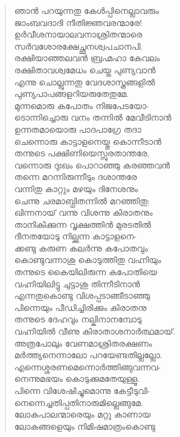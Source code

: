 \begin{verse}
ഞാന്‍ പറയുന്നതു കേള്‍പ്പിനെല്ലാവരും\\
ജാംബവദാദി നീതിജ്ഞവരന്മാരേ!\\
ഉര്‍വീശനായാലവനാശ്രിതന്മാരെ\\
സര്‍വശോരക്ഷേച്ഛുനശ്വപചാനപി.\\
രക്ഷിയാഞ്ഞലവന്‍ ബ്രഹ്മഹാ കേവലം\\
രക്ഷിതാവശ്വമേധം ചെയ്ത പുണ്യവാന്‍\\
എന്നു ചൊല്ലുന്നതു വേദശാസ്ത്രങ്ങളില്‍\\
പുണ്യപാപങ്ങളറിയരുതേതുമേ.\\
മുന്നമൊരു കപോതം നിജപേടയോ-\\
ടൊന്നിച്ചൊരു വനം തന്നില്‍ മേവീടിനാന്‍\\
ഉന്നതമായൊരു പാദപാഗ്രേ തദാ\\
ചെന്നൊരു കാട്ടാളനെയ്തു കൊന്നീടാന്‍\\
തന്നുടെ പക്ഷിണിയെസ്സുരതാന്തരേ,\\
വന്നൊരു ദുഃഖം പൊറാഞ്ഞു കരഞ്ഞവന്‍\\
തന്നെ മറന്നിരുന്നീടും ദശാന്തരേ\\
വന്നിതു കാറ്റും മഴയും ദിനേശനും\\
ചെന്നു ചരമാബ്ധിതന്നില്‍ മറഞ്ഞിതു;\\
ഖിന്നനായ് വന്നു വിശന്നു കിരാതനും\\
താനികിക്കുന്ന വൃക്ഷത്തിന്‍ മുരടതില്‍\\
ദീനതയോടു നില്ക്കുന്ന കാട്ടാളനെ-\\
ക്കണ്ടു കരുണ കലര്‍ന്നു കപോതവും\\
കൊണ്ടുവന്നാശു കൊടുത്തിതു വഹ്നിയും\\
തന്നുടെ കൈയിലിരുന്ന കപോതിയെ\\
വഹ്നിയിലിട്ടു ചുട്ടാശു തിന്നീടിനാന്‍\\
എന്നതുകൊണ്ടു വിശപ്പടാങ്ങീടാഞ്ഞു\\
പിന്നെയും പീഡിച്ചിരിക്കും കിരാതനു\\
തന്നുടെ ദേഹവും നല്കിനാനമ്പോടു\\
വഹ്നിയില്‍ വീണു കിരാതാശനാര്‍ത്ഥമായ്.\\
അത്രപോലും വേണമാശ്രിതരക്ഷണം\\
മര്‍ത്ത്യനെന്നാലോ പറയേണ്ടതില്ലല്ലോ.\\
എന്നെശ്ശരണമെന്നൊര്‍ത്തിങ്ങുവന്നവ-\\
നെന്നുമഭയം കൊടുക്കുമതേയുള്ളൂ.\\
പിന്നെ വിശേഷിച്ചുമൊന്നു കേട്ടീടുവി-\\
നെന്നെച്ചതിപ്പതിനാരുമില്ലെങ്ങുമേ.\\
ലോകപാലന്മാരെയും മറ്റു കാണായ\\
ലോകങ്ങളെയും നിമിഷമാത്രംകൊണ്ടു\\

\end{verse}
